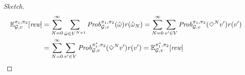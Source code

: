 \begin{proof}[Sketch]
  \begin{align*}
  \mathbb{E}^{\pi_{1}, \pi_{2}}_{\mathcal{G},v}[\textit{rew}]   &  = \sum^\infty_{N=0} \sum_{\hat{\omega} \in V^{N+1}} \mathit{Prob}^{\pi_{1}, \pi_{2}}_{\mathcal{G},v}(\hat{\omega})\mathit{r}(\hat{\omega}_N)
   = \sum^\infty_{N=0} \sum_{v' \in V} \mathit{Prob}^{\pi_{1}, \pi_{2}}_{\mathcal{G},v}(\Diamond^N v')\mathit{r}(v') \\
  & =  \sum^\infty_{N=0} \sum_{v' \in V} \mathit{Prob}^{\pi^*_{1}, \pi_{2}}_{\mathcal{G},v}(\Diamond^N v')\mathit{r}(v') 
   = \mathbb{E}^{\pi^*_{1}, \pi_{2}}_{\mathcal{G},v}[\textit{rew}] \tag*{\qedhere}
  \end{align*}

\end{proof}
\fi
\iffalse
